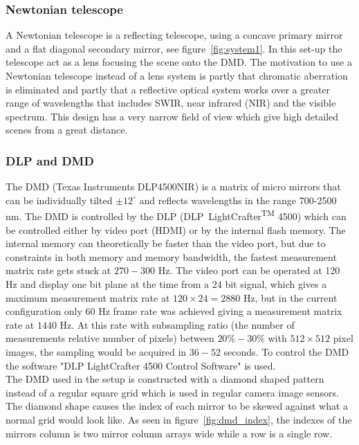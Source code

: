 \subsubsection{Newtonian telescope}
A Newtonian telescope is a reflecting telescope, using a concave primary mirror and a flat diagonal secondary mirror, see figure~\ref{fig:system1}. In this set-up the telescope act as a lens focusing the scene onto the DMD. The motivation to use a Newtonian telescope instead of a lens system is partly that chromatic aberration is eliminated and partly that a reflective optical system works over a greater range of wavelengths that includes SWIR, near infrared (NIR) and the visible spectrum. This design has a very narrow field of view which give high detailed scenes from a great distance. 


\subsubsection{DLP and DMD}
The DMD (Texas Instruments DLP4500NIR) is a matrix of micro mirrors that can be individually tilted $\pm 12^{\circ}$ and reflects wavelengths in the range 700-2500 nm. The DMD is controlled by the DLP (DLP\textregistered ~LightCrafter\textsuperscript{TM} 4500) which can be controlled either by video port (HDMI) or by the internal flash memory. The internal memory can theoretically be faster than the video port, but due to constraints in both memory and memory bandwidth, the fastest measurement matrix rate gets stuck at $270 - 300$ Hz. The video port can be operated at 120 Hz and display one bit plane at the time from a $24$ bit signal, which gives a maximum measurement matrix rate at $120 \times 24 = 2880$ Hz, but in the current configuration only $60$ Hz frame rate was achieved giving a measurement matrix rate at $1440$ Hz. At this rate with subsampling ratio (the number of measurements relative number of pixels) between $20\% - 30\%$ with $512\times512$ pixel images, the sampling would be acquired in $36 - 52$ seconds. To control the DMD the software "DLP LightCrafter 4500 Control Software" is used.\cite{manual:DLP}\\[0.1in] 

The DMD used in the setup is constructed with a diamond shaped pattern instead of a regular square grid which is used in regular camera image sensors. The diamond shape causes the index of each mirror to be skewed against what a normal grid would look like. As seen in figure~\ref{fig:dmd_index}, the indexes of the mirrors column is two mirror column arrays wide while a row is a single row. 


